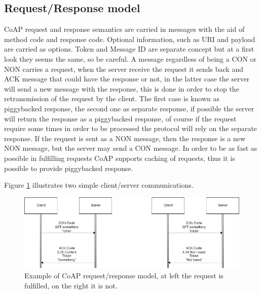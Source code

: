 	\subsection{Request/Response model}
	CoAP request and response semantics are carried in messages with the aid of method code and response code.\newline
	Optional information, such as URI and payload are carried as options.\newline
	Token and Message ID are separate concept but at a first look they seems the same, so be careful.\newline
	\newline
	A message regardless of being a CON or NON carries a request, when the server receive the request it sends back and ACK message that could have the response or not, in the latter case the server will
	send a new message with the response, this is done in order to stop the retransmission of the request by the client.\newline
	The first case is known as piggybacked response, the second one as separate response, if possible the server will return the response as a piggybacked response, of course if the request require some
	times in order to be processed the protocol will rely on the separate response.\newline
	If the request is sent as a NON message, then the response is a new NON message,  but the server may send a CON message.\newline
	\newline
	In order to be as fast as possible in fulfilling requests CoAP supports caching of requests, thus it is possible to provide piggybacked response.\newline
	
	Figure \ref{fig:coap0} illustrates two simple client/server communications.
	
	\begin{figure}
		\includegraphics[width=\linewidth]{coap-img0.png}
		\caption{Example of CoAP request/response model, at left the request is fulfilled, on the right it is not.}
		\label{fig:coap0}
	\end{figure}


